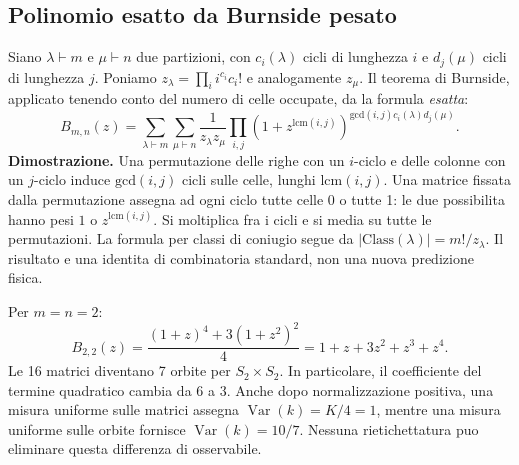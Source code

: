 \documentclass[11pt,a4paper]{article}
\begin{document}
\subsection*{Polinomio esatto da Burnside pesato}
Siano $\lambda\vdash m$ e $\mu\vdash n$ due partizioni, con $c_i(\lambda)$ cicli di lunghezza $i$ e $d_j(\mu)$ cicli di lunghezza $j$. Poniamo $z_\lambda=\prod_i i^{c_i}c_i!$ e analogamente $z_\mu$. Il teorema di Burnside, applicato tenendo conto del numero di celle occupate, da la formula \emph{esatta}:
\begin{equation}\label{eq:r12bb_lq_burnside}
\boxed{\displaystyle
B_{m,n}(z)=\sum_{\lambda\vdash m}\sum_{\mu\vdash n}
\frac{1}{z_\lambda z_\mu}\prod_{i,j}
\left(1+z^{\mathrm{lcm}(i,j)}\right)^{\mathrm{gcd}(i,j)c_i(\lambda)d_j(\mu)}.}
\end{equation}
\textbf{Dimostrazione.} Una permutazione delle righe con un $i$-ciclo e delle colonne con un $j$-ciclo induce $\mathrm{gcd}(i,j)$ cicli sulle celle, lunghi $\mathrm{lcm}(i,j)$. Una matrice fissata dalla permutazione assegna ad ogni ciclo tutte celle 0 o tutte 1: le due possibilita hanno pesi $1$ o $z^{\mathrm{lcm}(i,j)}$. Si moltiplica fra i cicli e si media su tutte le permutazioni. La formula per classi di coniugio segue da $|\mathrm{Class}(\lambda)|=m!/z_\lambda$. Il risultato e una identita di combinatoria standard, non una nuova predizione fisica.

Per $m=n=2$:
\begin{equation}
B_{2,2}(z)=\frac{(1+z)^4+3(1+z^2)^2}{4}
=1+z+3z^2+z^3+z^4.
\end{equation}
Le 16 matrici diventano 7 orbite per $S_2\times S_2$. In particolare, il coefficiente del termine quadratico cambia da $6$ a $3$. Anche dopo normalizzazione positiva, una misura uniforme sulle matrici assegna $\operatorname{Var}(k)=K/4=1$, mentre una misura uniforme sulle orbite fornisce $\operatorname{Var}(k)=10/7$. Nessuna rietichettatura puo eliminare questa differenza di osservabile.
\end{document}
